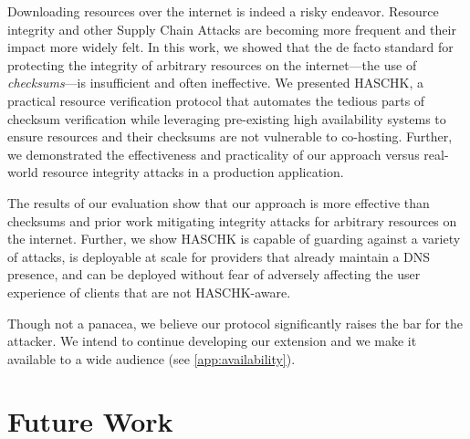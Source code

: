 Downloading resources over the internet is indeed a risky endeavor. Resource
integrity and other Supply Chain Attacks are becoming more frequent and their
impact more widely felt. In this work, we showed that the de facto standard for
protecting the integrity of arbitrary resources on the internet---the use of
\emph{checksums}---is insufficient and often ineffective. We presented
HASCHK, a practical resource verification protocol that automates the tedious
parts of checksum verification while leveraging pre-existing high availability
systems to ensure resources and their checksums are not vulnerable to
co-hosting. Further, we demonstrated the effectiveness and practicality of our
approach versus real-world resource integrity attacks in a production
application.

The results of our evaluation show that our approach is more effective than
checksums and prior work mitigating integrity attacks for arbitrary resources on
the internet. Further, we show HASCHK is capable of guarding against a
variety of attacks, is deployable at scale for providers that already maintain a
DNS presence, and can be deployed without fear of adversely affecting the user
experience of clients that are not HASCHK-aware.

Though not a panacea, we believe our protocol significantly raises the bar for
the attacker. We intend to continue developing our extension and we make it
available to a wide audience (see \cref{app:availability}).

\section{Future Work}

